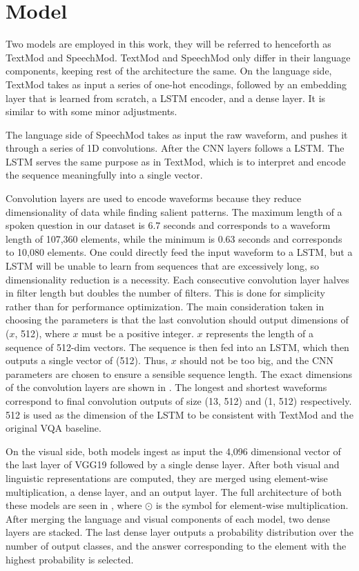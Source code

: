 \documentclass[letterpaper]{article} %
\begin{document}
\section{Model}
Two models are employed in this work, they will be referred to henceforth as TextMod and SpeechMod. TextMod and SpeechMod only differ in their language components, keeping rest of the architecture the same. On the language side, TextMod takes as input a series of one-hot encodings, followed by an embedding layer that is learned from scratch, a LSTM encoder, and a dense layer. It is similar to \cite{VQA} with some minor adjustments.

The language side of SpeechMod takes as input the raw waveform, and pushes it through a series of 1D convolutions. After the CNN layers follows a LSTM. The LSTM serves the same purpose as in TextMod, which is to interpret and encode the sequence meaningfully into a single vector.

Convolution layers are used to encode waveforms because they reduce dimensionality of data while finding salient patterns. The maximum length of a spoken question in our dataset is 6.7 seconds and corresponds to a waveform length of 107,360 elements, while the minimum is 0.63 seconds and corresponds to 10,080 elements. One could directly feed the input waveform to a LSTM, but a LSTM will be unable to learn from sequences that are excessively long, so dimensionality reduction is a necessity. Each consecutive convolution layer halves in filter length but doubles the number of filters. This is done for simplicity rather than for performance optimization. The main consideration taken in choosing the parameters is that the last convolution should output dimensions of ($x$, 512), where $x$ must be a positive integer. $x$ represents the length of a sequence of 512-dim vectors. The sequence is then fed into an LSTM, which then outputs a single vector of (512). Thus, $x$ should not be too big, and the CNN parameters are chosen to ensure a sensible sequence length. The exact dimensions of the convolution layers are shown in . The longest and shortest waveforms correspond to final convolution outputs of size (13, 512) and (1, 512) respectively. 512 is used as the dimension of the LSTM to be consistent with TextMod and the original VQA baseline.

On the visual side, both models ingest as input the 4,096 dimensional vector of the last layer of VGG19 \cite{vgg16} followed by a single dense layer. After both visual and linguistic representations are computed, they are merged using element-wise multiplication, a dense layer, and an output layer. The full architecture of both these models are seen in , where $\displaystyle\odot$ is the symbol for element-wise multiplication. After merging the language and visual components of each model, two dense layers are stacked. The last dense layer outputs a probability distribution over the number of output classes, and the answer corresponding to the element with the highest probability is selected.
\end{document}
